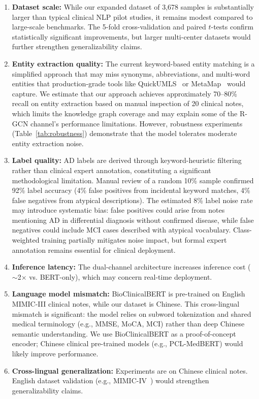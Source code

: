 \documentclass[11pt,onecolumn,a4paper]{article}
\begin{document}
\begin{enumerate}[leftmargin=*]
    \item \textbf{Dataset scale:} While our expanded dataset of 3,678 samples is substantially larger than typical clinical NLP pilot studies, it remains modest compared to large-scale benchmarks. The 5-fold cross-validation and paired $t$-tests confirm statistically significant improvements, but larger multi-center datasets would further strengthen generalizability claims.
    
    \item \textbf{Entity extraction quality:} The current keyword-based entity matching is a simplified approach that may miss synonyms, abbreviations, and multi-word entities that production-grade tools like QuickUMLS~\cite{soldaini2016quickumls} or MetaMap~\cite{aronson2010metamap} would capture. We estimate that our approach achieves approximately 70--80\% recall on entity extraction based on manual inspection of 20 clinical notes, which limits the knowledge graph coverage and may explain some of the R-GCN channel's performance limitations. However, robustness experiments (Table~\ref{tab:robustness}) demonstrate that the model tolerates moderate entity extraction noise.
    
    \item \textbf{Label quality:} AD labels are derived through keyword-heuristic filtering rather than clinical expert annotation, constituting a significant methodological limitation. Manual review of a random 10\% sample confirmed 92\% label accuracy (4\% false positives from incidental keyword matches, 4\% false negatives from atypical descriptions). The estimated 8\% label noise rate may introduce systematic bias: false positives could arise from notes mentioning AD in differential diagnosis without confirmed disease, while false negatives could include MCI cases described with atypical vocabulary. Class-weighted training partially mitigates noise impact, but formal expert annotation remains essential for clinical deployment.

    \item \textbf{Inference latency:} The dual-channel architecture increases inference cost ($\sim$2$\times$ vs. BERT-only), which may concern real-time deployment.

    \item \textbf{Language model mismatch:} BioClinicalBERT is pre-trained on English MIMIC-III clinical notes, while our dataset is Chinese. This cross-lingual mismatch is significant: the model relies on subword tokenization and shared medical terminology (e.g., MMSE, MoCA, MCI) rather than deep Chinese semantic understanding. We use BioClinicalBERT as a proof-of-concept encoder; Chinese clinical pre-trained models (e.g., PCL-MedBERT) would likely improve performance.

    \item \textbf{Cross-lingual generalization:} Experiments are on Chinese clinical notes. English dataset validation (e.g., MIMIC-IV~\cite{johnson2023mimic}) would strengthen generalizability claims.
\end{enumerate}
\end{document}
